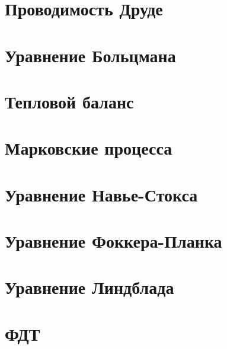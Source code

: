 





\section{Проводимость Друде}


\section{Уравнение Больцмана}


\section{Тепловой баланс}


\section{Марковские процесса}


\section{Уравнение Навье-Стокса}


\section{Уравнение Фоккера-Планка}


\section{Уравнение Линдблада}


\section{ФДТ}



% 

% 



